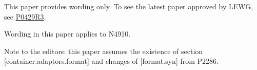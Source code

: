 
% 

This paper provides wording only.  To see the latest paper approved by LEWG,
see \href{http://www.open-std.org/jtc1/sc22/wg21/docs/papers/2017/p0429r3.pdf}{P0429R3}.

Wording in this paper applies to N4910.

Note to the editors: this paper assumes the existence of section
[container.adaptors.format] and changes of [format.syn] from P2286.

\markboth{\contentsname}{}

\makeatletter
\renewcommand\@pnumwidth{2.5em}
\makeatother

\tableofcontents
\setcounter{tocdepth}{5}

%
